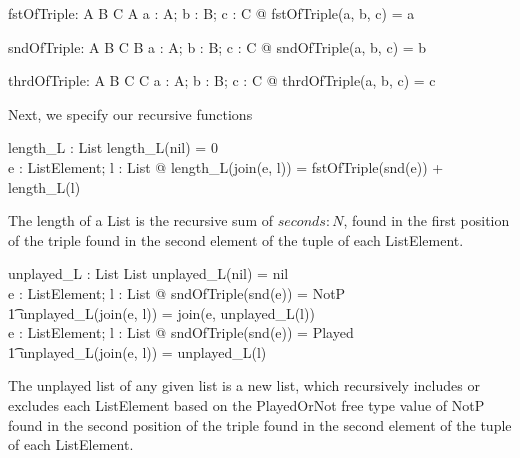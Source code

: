 \documentclass[a4paper,10pt,fleqn]{article}
\begin{document}
\bigskip


\bigskip

\setlength{\leftskip}{\dimexpr\parindent+2em\relax}
\begin{gendef}[A, B, C]
  fstOfTriple: A \cross B \cross C \fun A
\where
  \forall a : A; b : B; c : C @ fstOfTriple(a, b, c) = a
\end{gendef}

\begin{gendef}[A, B, C]
  sndOfTriple: A \cross B \cross C \fun B
\where
  \forall a : A; b : B; c : C @ sndOfTriple(a, b, c) = b
\end{gendef}

\begin{gendef}[A, B, C]
  thrdOfTriple: A \cross B \cross C \fun C
\where
  \forall a : A; b : B; c : C @ thrdOfTriple(a, b, c) = c
\end{gendef}

\noindent Next, we specify our recursive functions

\bigskip

\begin{axdef}
length\_L : List \fun \nat
\where
length\_L(nil) = 0 \\
\forall e : ListElement; l : List @ length\_L(join(e, l)) = fstOfTriple(snd(e)) + length\_L(l)
\end{axdef}

\noindent The length of a List is the recursive sum of $seconds : N$, found in the first position of the triple found in the second element of the tuple of each ListElement.

\bigskip

\begin{axdef}
unplayed\_L : List \fun List
\where
unplayed\_L(nil) = nil \\
\forall e : ListElement; l : List @ sndOfTriple(snd(e)) = NotP \implies \\
\t1 unplayed\_L(join(e, l)) = join(e, unplayed\_L(l)) \\
\forall e : ListElement; l : List @ sndOfTriple(snd(e)) = Played \implies \\
\t1 unplayed\_L(join(e, l)) = unplayed\_L(l)
\end{axdef}

\noindent The unplayed list of any given list is a new list, which recursively includes or excludes each ListElement based on the PlayedOrNot free type value of NotP found in the second position of the triple found in the second element of the tuple of each ListElement. 
\end{document}
